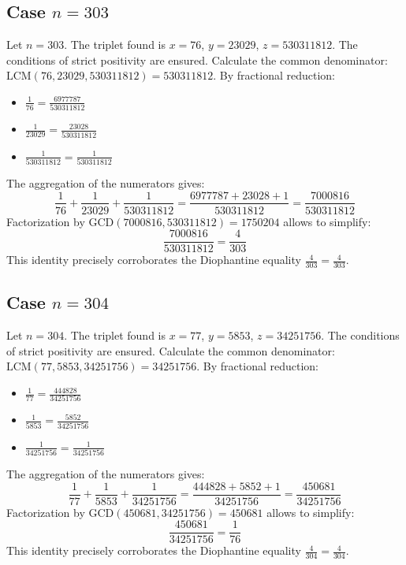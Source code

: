 \documentclass[11pt,a4paper]{article}
\begin{document}
\subsection{Case $n = 303$}
Let $n = 303$. The triplet found is $x = 76$, $y = 23029$, $z = 530311812$.
The conditions of strict positivity are ensured.
Calculate the common denominator: $\text{LCM}(76, 23029, 530311812) = 530311812$.
By fractional reduction:
\begin{itemize}
    \item $\frac{1}{76} = \frac{6977787}{530311812}$
    \item $\frac{1}{23029} = \frac{23028}{530311812}$
    \item $\frac{1}{530311812} = \frac{1}{530311812}$
\end{itemize}
The aggregation of the numerators gives:
$$ \frac{1}{76} + \frac{1}{23029} + \frac{1}{530311812} = \frac{6977787 + 23028 + 1}{530311812} = \frac{7000816}{530311812} $$
Factorization by $\text{GCD}(7000816, 530311812) = 1750204$ allows to simplify:
$$ \frac{7000816}{530311812} = \frac{4}{303} $$
This identity precisely corroborates the Diophantine equality $\frac{4}{303} = \frac{4}{303}$.

\subsection{Case $n = 304$}
Let $n = 304$. The triplet found is $x = 77$, $y = 5853$, $z = 34251756$.
The conditions of strict positivity are ensured.
Calculate the common denominator: $\text{LCM}(77, 5853, 34251756) = 34251756$.
By fractional reduction:
\begin{itemize}
    \item $\frac{1}{77} = \frac{444828}{34251756}$
    \item $\frac{1}{5853} = \frac{5852}{34251756}$
    \item $\frac{1}{34251756} = \frac{1}{34251756}$
\end{itemize}
The aggregation of the numerators gives:
$$ \frac{1}{77} + \frac{1}{5853} + \frac{1}{34251756} = \frac{444828 + 5852 + 1}{34251756} = \frac{450681}{34251756} $$
Factorization by $\text{GCD}(450681, 34251756) = 450681$ allows to simplify:
$$ \frac{450681}{34251756} = \frac{1}{76} $$
This identity precisely corroborates the Diophantine equality $\frac{4}{304} = \frac{4}{304}$.
\end{document}
